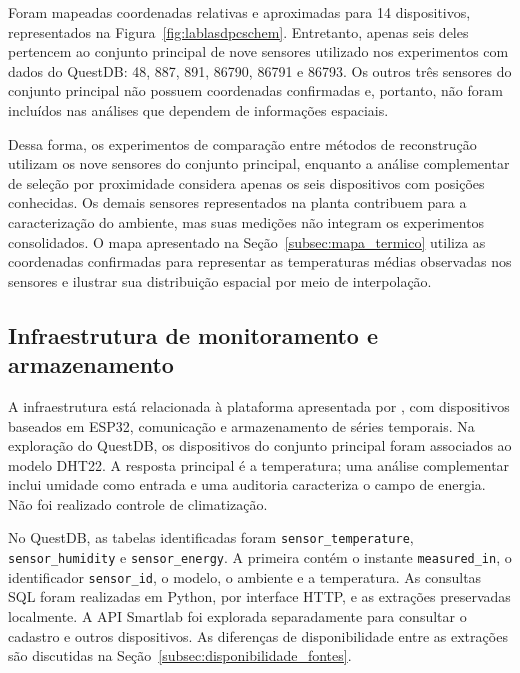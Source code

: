 Foram mapeadas coordenadas relativas e aproximadas para 14 dispositivos, representados na Figura~\ref{fig:lablasdpcschem}. Entretanto, apenas seis deles pertencem ao conjunto principal de nove sensores utilizado nos experimentos com dados do QuestDB: 48, 887, 891, 86790, 86791 e 86793. Os outros três sensores do conjunto principal não possuem coordenadas confirmadas e, portanto, não foram incluídos nas análises que dependem de informações espaciais.

Dessa forma, os experimentos de comparação entre métodos de reconstrução utilizam os nove sensores do conjunto principal, enquanto a análise complementar de seleção por proximidade considera apenas os seis dispositivos com posições conhecidas. Os demais sensores representados na planta contribuem para a caracterização do ambiente, mas suas medições não integram os experimentos consolidados. O mapa apresentado na Seção~\ref{subsec:mapa_termico} utiliza as coordenadas confirmadas para representar as temperaturas médias observadas nos sensores e ilustrar sua distribuição espacial por meio de interpolação.

\subsection{Infraestrutura de monitoramento e armazenamento}
\label{subsec:infraestrutura_monitoramento}

A infraestrutura está relacionada à plataforma apresentada por
, com dispositivos baseados em ESP32,
comunicação e armazenamento de séries temporais. Na exploração do
QuestDB, os dispositivos do conjunto principal foram associados ao
modelo DHT22. A resposta principal é a temperatura; uma análise complementar inclui
umidade como entrada e uma auditoria caracteriza o campo de energia.
Não foi realizado controle de climatização.

No QuestDB, as tabelas identificadas foram
\texttt{sensor\_temperature}, \texttt{sensor\_humidity} e
\texttt{sensor\_energy}. A primeira contém o instante
\texttt{measured\_in}, o identificador \texttt{sensor\_id}, o modelo,
o ambiente e a temperatura. As consultas SQL foram realizadas em
Python, por interface HTTP, e as extrações preservadas localmente.
A API Smartlab foi explorada separadamente para consultar o cadastro
e outros dispositivos. As diferenças de disponibilidade entre as
extrações são discutidas na Seção~\ref{subsec:disponibilidade_fontes}.



